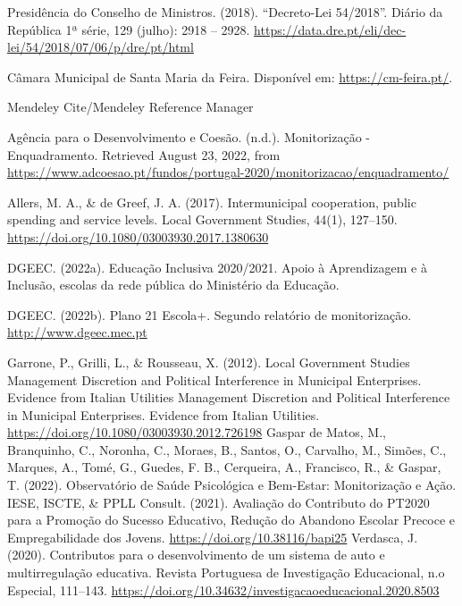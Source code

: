\documentclass[
]{book}
\begin{document}
Presidência do Conselho de Ministros. (2018). ``Decreto-Lei 54/2018''. Diário da República 1ª série, 129 (julho): 2918 -- 2928. \url{https://data.dre.pt/eli/dec-lei/54/2018/07/06/p/dre/pt/html}

Câmara Municipal de Santa Maria da Feira. Disponível em: \url{https://cm-feira.pt/}.

Mendeley Cite/Mendeley Reference Manager

Agência para o Desenvolvimento e Coesão. (n.d.). Monitorização - Enquadramento. Retrieved August 23, 2022, from \url{https://www.adcoesao.pt/fundos/portugal-2020/monitorizacao/enquadramento/}

Allers, M. A., \& de Greef, J. A. (2017). Intermunicipal cooperation, public spending and service levels. Local Government Studies, 44(1), 127--150. \url{https://doi.org/10.1080/03003930.2017.1380630}

DGEEC. (2022a). Educação Inclusiva 2020/2021. Apoio à Aprendizagem e à Inclusão, escolas da rede pública do Ministério da Educação.

DGEEC. (2022b). Plano 21 Escola+. Segundo relatório de monitorização. \url{http://www.dgeec.mec.pt}

Garrone, P., Grilli, L., \& Rousseau, X. (2012). Local Government Studies Management Discretion and Political Interference in Municipal Enterprises. Evidence from Italian Utilities Management Discretion and Political Interference in Municipal Enterprises. Evidence from Italian Utilities. \url{https://doi.org/10.1080/03003930.2012.726198}
Gaspar de Matos, M., Branquinho, C., Noronha, C., Moraes, B., Santos, O., Carvalho, M., Simões, C., Marques, A., Tomé, G., Guedes, F. B., Cerqueira, A., Francisco, R., \& Gaspar, T. (2022). Observatório de Saúde Psicológica e Bem-Estar: Monitorização e Ação.
IESE, ISCTE, \& PPLL Consult. (2021). Avaliação do Contributo do PT2020 para a Promoção do Sucesso Educativo, Redução do Abandono Escolar Precoce e Empregabilidade dos Jovens. \url{https://doi.org/10.38116/bapi25}
Verdasca, J. (2020). Contributos para o desenvolvimento de um sistema de auto e multirregulação educativa. Revista Portuguesa de Investigação Educacional, n.o Especial, 111--143. \url{https://doi.org/10.34632/investigacaoeducacional.2020.8503}
\end{document}

